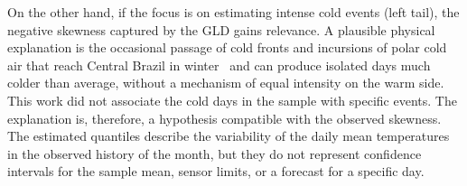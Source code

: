 On the other hand, if the focus is on estimating intense cold events (left tail), the negative skewness captured by the GLD gains relevance. A plausible physical explanation is the occasional passage of cold fronts and incursions of polar cold air that reach Central Brazil in winter~\cite{garreaud2000} and can produce isolated days much colder than average, without a mechanism of equal intensity on the warm side. This work did not associate the cold days in the sample with specific events. The explanation is, therefore, a hypothesis compatible with the observed skewness. The estimated quantiles describe the variability of the daily mean temperatures in the observed history of the month, but they do not represent confidence intervals for the sample mean, sensor limits, or a forecast for a specific day.
